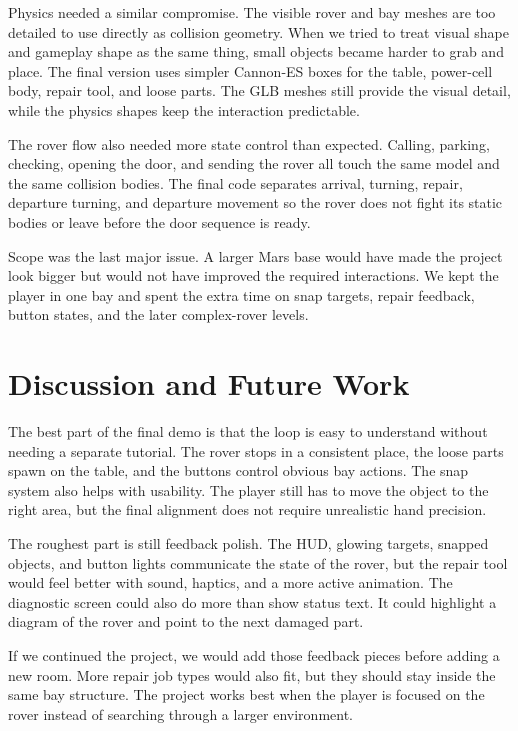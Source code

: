 \documentclass[conference]{IEEEtran}
\begin{document}
Physics needed a similar compromise. The visible rover and bay meshes are too
detailed to use directly as collision geometry. When we tried to treat visual
shape and gameplay shape as the same thing, small objects became harder to grab
and place. The final version uses simpler Cannon-ES boxes for the table,
power-cell body, repair tool, and loose parts. The GLB meshes still provide the
visual detail, while the physics shapes keep the interaction predictable.

The rover flow also needed more state control than expected. Calling, parking,
checking, opening the door, and sending the rover all touch the same model and
the same collision bodies. The final code separates arrival, turning, repair,
departure turning, and departure movement so the rover does not fight its static
bodies or leave before the door sequence is ready.

Scope was the last major issue. A larger Mars base would have made the project
look bigger but would not have improved the required interactions. We kept the
player in one bay and spent the extra time on snap targets, repair feedback,
button states, and the later complex-rover levels.

\section{Discussion and Future Work}

The best part of the final demo is that the loop is easy to understand without
needing a separate tutorial. The rover stops in a consistent place, the loose
parts spawn on the table, and the buttons control obvious bay actions. The snap
system also helps with usability. The player still has to move the object to the
right area, but the final alignment does not require unrealistic hand precision.

The roughest part is still feedback polish. The HUD, glowing targets, snapped
objects, and button lights communicate the state of the rover, but the repair
tool would feel better with sound, haptics, and a more active animation. The
diagnostic screen could also do more than show status text. It could highlight a
diagram of the rover and point to the next damaged part.

If we continued the project, we would add those feedback pieces before adding a
new room. More repair job types would also fit, but they should stay inside the
same bay structure. The project works best when the player is focused on the
rover instead of searching through a larger environment.
\end{document}
